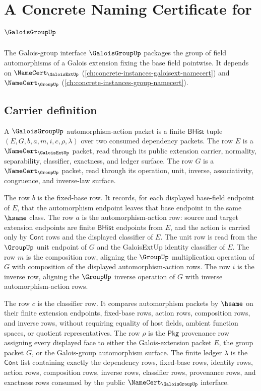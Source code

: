 \chapter{A Concrete Naming Certificate for $\GaloisGroupUp$}
\label{ch:concrete-instances-galoisgroup-namecert}

The Galois-group interface $\GaloisGroupUp$ packages the group of field automorphisms of a Galois extension fixing the base field pointwise. It depends on $\NameCert_{\GaloisExtUp}$ (\autoref{ch:concrete-instances-galoisext-namecert}) and $\NameCert_{\GroupUp}$ (\autoref{ch:concrete-instances-group-namecert}).

\section{Carrier definition}
\label{sec:galoisgroup-carrier}

\begin{definition}
\label{def:galoisgroup-bhist-automorphism-action-packet}
A $\GaloisGroupUp$ automorphism-action packet is a finite $\mathsf{BHist}$
tuple $(E,G,b,a,m,i,c,\rho,\lambda)$ over two consumed dependency packets. The
row $E$ is a $\NameCert_{\GaloisExtUp}$ packet, read through its public
extension carrier, normality, separability, classifier, exactness, and ledger
surface. The row $G$ is a $\NameCert_{\GroupUp}$ packet, read through its
operation, unit, inverse, associativity, congruence, and inverse-law surface.

The row $b$ is the fixed-base row. It records, for each displayed base-field
endpoint of $E$, that the automorphism endpoint leaves that base endpoint in
the same $\hsame$ class. The row $a$ is the automorphism-action row: source
and target extension endpoints are finite $\mathsf{BHist}$ endpoints from
$E$, and the action is carried only by $\mathsf{Cont}$ rows and the displayed
classifier of $E$. The unit row is read from the $\GroupUp$ unit endpoint of
$G$ and the GaloisExtUp identity classifier of $E$. The row $m$ is the
composition row, aligning the $\GroupUp$ multiplication operation of $G$ with
composition of the displayed automorphism-action rows. The row $i$ is the
inverse row, aligning the $\GroupUp$ inverse operation of $G$ with inverse
automorphism-action rows.

The row $c$ is the classifier row. It compares automorphism packets by
$\hsame$ on their finite extension endpoints, fixed-base rows, action rows,
composition rows, and inverse rows, without requiring equality of host fields,
ambient function spaces, or quotient representatives. The row $\rho$ is the
$\mathsf{Pkg}$ provenance row assigning every displayed face to either the
Galois-extension packet $E$, the group packet $G$, or the Galois-group
automorphism surface. The finite ledger $\lambda$ is the $\mathsf{Cont}$ list
containing exactly the dependency rows, fixed-base rows, identity rows, action
rows, composition rows, inverse rows, classifier rows, provenance rows, and
exactness rows consumed by the public $\NameCert_{\GaloisGroupUp}$ interface.
\end{definition}

